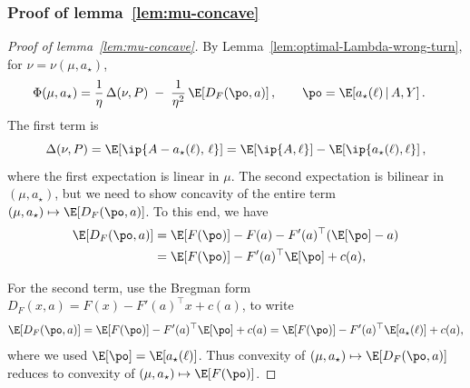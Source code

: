\subsubsection{Proof of lemma~\ref{lem:mu-concave}}
\label{proof:lem:mu-concave}
\begin{proof}[Proof of lemma~\ref{lem:mu-concave}]
    By Lemma~\ref{lem:optimal-Lambda-wrong-turn}, for $\nu=\nu(\mu,a_\star)$,
    \begin{align}
        \Phi(\mu,a_\star)
         & = \frac{1}{\eta}\,\Delta(\nu,P) \;-\; \frac{1}{\eta^2}\,
        \E\!\left[D_F\!\left(\po,a\right)\right],
        \qquad \po=\E\!\left[a_\star(\ell)\,\middle|\,A,Y\right].
        \label{eq:phi-decomp}
    \end{align}
    The first term is
    \[
        \Delta(\nu,P)
        = \E\!\left[\ip{A-a_\star(\ell),\,\ell}\right]
        = \E\!\left[\ip{A,\ell}\right] - \E\!\left[\ip{a_\star(\ell),\ell}\right],
    \]
    where the first expectation is linear in $\mu$.
    The second expectation is bilinear in $(\mu,a_\star)$,
    but we need to show concavity of the entire term
    $(\mu,a_\star)\mapsto \E[D_F(\po,a)]$.
    To this end, we have
    \begin{align*}
        \E\!\left[D_F(\po,a)\right]
         & = \E\!\left[F(\po)\right] - F(a) - F'(a)^\top (\E[\po]-a) \\
         & = \E\!\left[F(\po)\right] - F'(a)^\top \E[\po] + c(a),
    \end{align*}

    For the second term, use the Bregman form
    $D_F(x,a)=F(x)-F'(a)^\top x + c(a)$,
    to write
    \[
        \E\!\left[D_F(\po,a)\right]
        = \E\!\left[F(\po)\right] - F'(a)^\top \E[\po] + c(a)
        = \E\!\left[F(\po)\right] - F'(a)^\top \E[a_\star(\ell)] + c(a),
    \]
    where we used $\E[\po]=\E[a_\star(\ell)]$.
    Thus convexity of $(\mu,a_\star)\mapsto \E[D_F(\po,a)]$ reduces to convexity of
    $(\mu,a_\star)\mapsto \E[F(\po)]$.


\end{proof}
